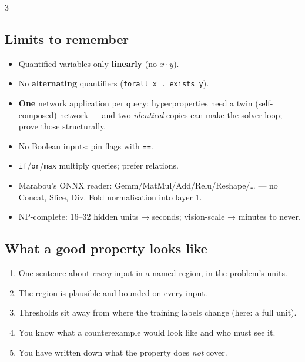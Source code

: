 \documentclass[10pt]{article}
\begin{document}
\begin{multicols}{3}
\subsection*{Limits to remember}
\begin{itemize}
  \item Quantified variables only \textbf{linearly} (no $x\cdot y$).
  \item No \textbf{alternating} quantifiers (\texttt{forall x . exists y}).
  \item \textbf{One} network application per query: hyperproperties need a twin (self-composed) network — and two \emph{identical} copies can make the solver loop; prove those structurally.
  \item No Boolean inputs: pin flags with \texttt{==}.
  \item \texttt{if}/\texttt{or}/\texttt{max} multiply queries; prefer relations.
  \item Marabou's ONNX reader: Gemm/MatMul/Add/Relu/Reshape/… — no Concat, Slice, Div. Fold normalisation into layer 1.
  \item NP-complete: 16–32 hidden units → seconds; vision-scale → minutes to never.
\end{itemize}

\subsection*{What a good property looks like}
\begin{enumerate}
  \item One sentence about \emph{every} input in a named region, in the problem's units.
  \item The region is plausible and bounded on every input.
  \item Thresholds sit away from where the training labels change (here: a full unit).
  \item You know what a counterexample would look like and who must see it.
  \item You have written down what the property does \emph{not} cover.
\end{enumerate}
\end{multicols}
\end{document}
